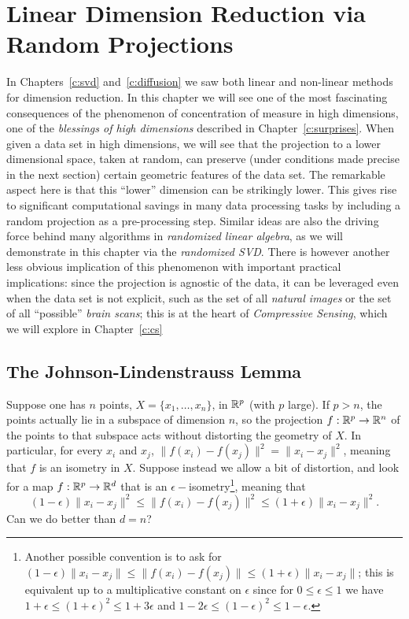 \chapter{Linear Dimension Reduction via Random Projections}
\label{c:johnson}



In Chapters~\ref{c:svd} and~\ref{c:diffusion} we saw both linear and non-linear methods for dimension reduction.
In this chapter we will see one of the most fascinating consequences of the phenomenon of concentration of measure in high dimensions, one of the \emph{blessings of high dimensions} described in Chapter~\ref{c:surprises}. When given a data set in high dimensions, we will see  that the projection to a lower dimensional space, taken at random, can preserve (under conditions made precise in the next section) certain geometric features of the data set. The remarkable aspect here is that this ``lower'' dimension can be strikingly lower. This gives rise to significant computational savings in many data processing tasks by including a random projection as a pre-processing step. Similar ideas are also the driving force behind many algorithms in {\em randomized linear algebra}, as we will demonstrate in this chapter via the {\em randomized SVD}.
There is however another less obvious implication of this phenomenon with important practical implications: since the projection is agnostic of the data, it can be leveraged even when the data set is not explicit, such as the set of all \emph{natural images} or the set of all ``possible'' \emph{brain scans}; this is at the heart of \emph{Compressive Sensing}, which we will explore in Chapter~\ref{c:cs}



\section{The Johnson-Lindenstrauss Lemma}\label{s:jl}

Suppose one has $n$ points, $X = \{x_1,\dots,x_n\}$, in $\mathbb{R}^p$ (with $p$ large). If $p>n$, the points actually lie in a subspace of dimension $n$, so the projection $f:\mathbb{R}^p\to \mathbb{R}^n$ of the points to that subspace acts without distorting the geometry of $X$. In particular, for every $x_i$ and $x_j$, $\|f(x_i)-f(x_j)\|^2 = \|x_i-x_j\|^2$, meaning that $f$ is an isometry in $X$.
Suppose instead we allow a bit of distortion, and look for a map $f:\mathbb{R}^p\to \mathbb{R}^d$ that is an $\epsilon-$isometry\footnote{Another possible convention is to ask for $(1-\epsilon) \|x_i-x_j\| \leq \|f(x_i)-f(x_j)\| \leq (1+\epsilon) \|x_i-x_j\|$; this is equivalent up to a multiplicative constant on $\epsilon$ since for $0\leq\epsilon\leq 1$ we have $1+\epsilon\leq (1+\epsilon)^2\leq 1+3\epsilon$ and $1-2\epsilon\leq (1-\epsilon)^2\leq 1-\epsilon$.}, meaning that
\begin{equation}\label{def_epsilonisometry}
(1-\epsilon) \|x_i-x_j\|^2 \leq \|f(x_i)-f(x_j)\|^2 \leq (1+\epsilon) \|x_i-x_j\|^2.
\end{equation}
Can we do better than $d=n$?

